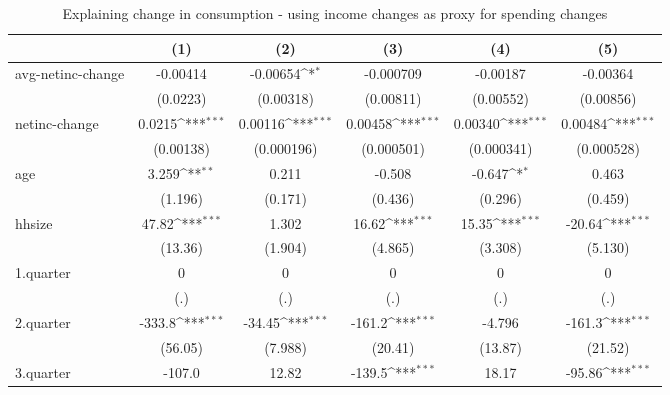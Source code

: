 \begin{table}[!h]\centering
\def\sym#1{\ifmmode^{#1}\else\(^{#1}\)\fi}
\caption{\label{tab:2.1C-deltacons-net} Explaining change in consumption - using income changes as proxy for spending changes}
\begin{tabular}{l*{5}{c}}
\hline\hline
            &\multicolumn{1}{c}{(1)}         &\multicolumn{1}{c}{(2)}         &\multicolumn{1}{c}{(3)}         &\multicolumn{1}{c}{(4)}         &\multicolumn{1}{c}{(5)}         \\
\hline
avg-netinc-change&    -0.00414         &    -0.00654\sym{*}  &   -0.000709         &    -0.00187         &    -0.00364         \\
            &    (0.0223)         &   (0.00318)         &   (0.00811)         &   (0.00552)         &   (0.00856)         \\
netinc-change&      0.0215\sym{***}&     0.00116\sym{***}&     0.00458\sym{***}&     0.00340\sym{***}&     0.00484\sym{***}\\
            &   (0.00138)         &  (0.000196)         &  (0.000501)         &  (0.000341)         &  (0.000528)         \\
age         &       3.259\sym{**} &       0.211         &      -0.508         &      -0.647\sym{*}  &       0.463         \\
            &     (1.196)         &     (0.171)         &     (0.436)         &     (0.296)         &     (0.459)         \\
hhsize      &       47.82\sym{***}&       1.302         &       16.62\sym{***}&       15.35\sym{***}&      -20.64\sym{***}\\
            &     (13.36)         &     (1.904)         &     (4.865)         &     (3.308)         &     (5.130)         \\
1.quarter   &           0         &           0         &           0         &           0         &           0         \\
            &         (.)         &         (.)         &         (.)         &         (.)         &         (.)         \\
2.quarter   &      -333.8\sym{***}&      -34.45\sym{***}&      -161.2\sym{***}&      -4.796         &      -161.3\sym{***}\\
            &     (56.05)         &     (7.988)         &     (20.41)         &     (13.87)         &     (21.52)         \\
3.quarter   &      -107.0         &       12.82         &      -139.5\sym{***}&       18.17         &      -95.86\sym{***}\\

\end{tabular}
\end{table}
